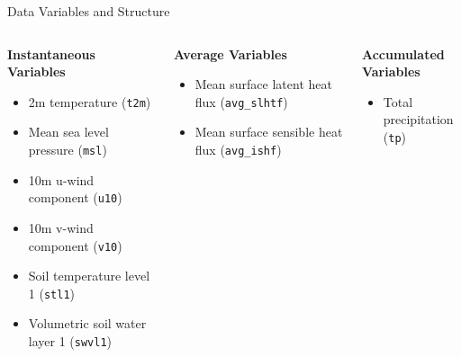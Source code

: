 \documentclass[aspectratio=169,t,xcolor=table]{beamer}
\begin{document}

\begin{frame}{Data Variables and Structure}
	\begin{columns}
		\begin{block}{\small \textbf{Instantaneous Variables}}
			\footnotesize
			\begin{itemize}
				\item {}  2m temperature (\texttt{t2m})
				\item {} Mean sea level pressure (\texttt{msl})
				\item {} 10m u-wind component (\texttt{u10})
				\item {} 10m v-wind component (\texttt{v10})
				\item {} Soil temperature level 1 (\texttt{stl1})
				\item {} Volumetric soil water layer 1 (\texttt{swvl1})
			\end{itemize}
		\end{block}

		\begin{block}{\small \textbf{Average Variables}}
			\footnotesize
			\begin{itemize}
				\item {} Mean surface latent heat flux (\texttt{avg\_slhtf})
				\item {} Mean surface sensible heat flux (\texttt{avg\_ishf})
			\end{itemize}
		\end{block}

		\vspace{0.8cm}

		\begin{block}{\small \textbf{Accumulated Variables}}
			\footnotesize
			\begin{itemize}
				\item {} Total precipitation (\texttt{tp})
			\end{itemize}
		\end{block}
	\end{columns}
\end{frame}
\end{document}
